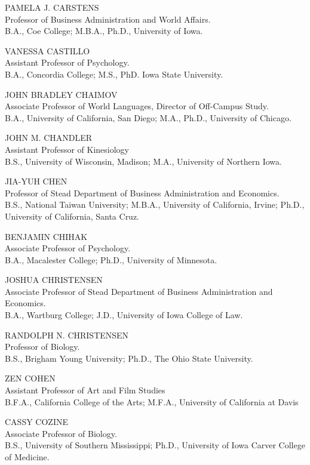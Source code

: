 \documentclass[
  letterpaper,
]{scrbook}
\begin{document}
PAMELA J. CARSTENS\\
Professor of Business Administration and World Affairs.\\
B.A., Coe College; M.B.A., Ph.D., University of Iowa.

VANESSA CASTILLO\\
Assistant Professor of Psychology.\\
B.A., Concordia College; M.S., PhD. Iowa State University.

JOHN BRADLEY CHAIMOV\\
Associate Professor of World Languages, Director of Off-Campus Study.\\
B.A., University of California, San Diego; M.A., Ph.D., University of
Chicago.

JOHN M. CHANDLER\\
Assistant Professor of Kinesiology\\
B.S., University of Wisconsin, Madison; M.A., University of Northern
Iowa.

JIA-YUH CHEN\\
Professor of Stead Department of Business Administration and
Economics.\\
B.S., National Taiwan University; M.B.A., University of California,
Irvine; Ph.D., University of California, Santa Cruz.

BENJAMIN CHIHAK\\
Associate Professor of Psychology.\\
B.A., Macalester College; Ph.D., University of Minnesota.

JOSHUA CHRISTENSEN\\
Associate Professor of Stead Department of Business Administration and
Economics.\\
B.A., Wartburg College; J.D., University of Iowa College of Law.

RANDOLPH N. CHRISTENSEN\\
Professor of Biology.\\
B.S., Brigham Young University; Ph.D., The Ohio State University.

ZEN COHEN\\
Assistant Professor of Art and Film Studies\\
B.F.A., California College of the Arts; M.F.A., University of California
at Davis

CASSY COZINE\\
Associate Professor of Biology.\\
B.S., University of Southern Mississippi; Ph.D., University of Iowa
Carver College of Medicine.
\end{document}
